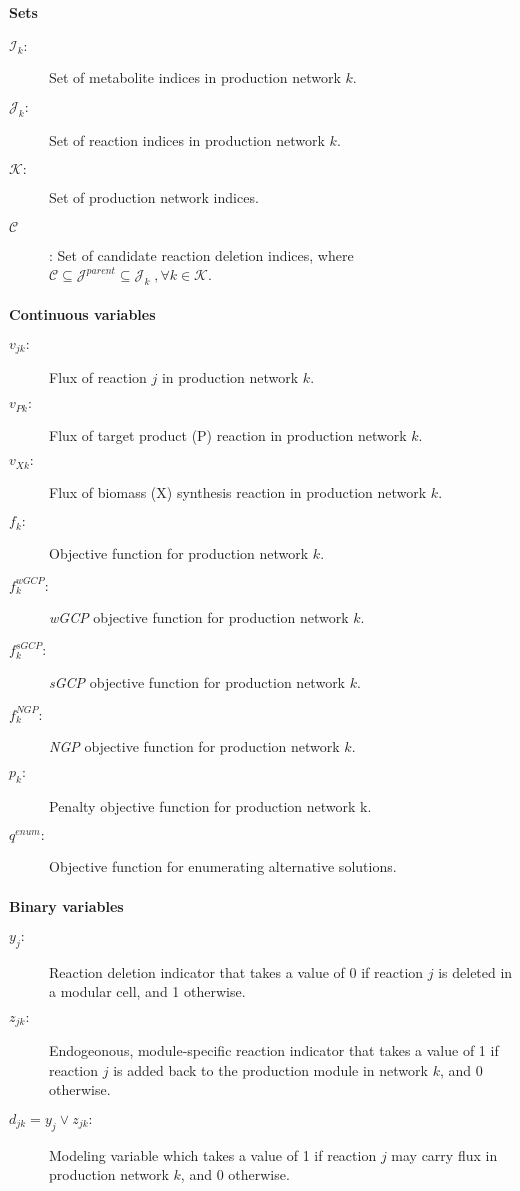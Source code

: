 \paragraph{Sets}
\begin{description}
\item[$\mathcal{I}_k:$] Set of metabolite indices in production network $k$.
\item[$\mathcal{J}_k:$] Set of reaction indices in production network $k$.
\item[$\mathcal{K}:$] Set of production network indices.
\item[$\mathcal{C}$]: Set of candidate reaction deletion indices, where $\mathcal{C} \subseteq \mathcal{J}^{parent} \subseteq \mathcal{J}_k \;, \forall k \in \mathcal{K}$.
\end{description}

\paragraph{Continuous variables}
\begin{description}
\item[$v_{jk}:$] Flux of reaction $j$ in production network $k$.
\item[$v_{Pk}:$] Flux of target product (P) reaction in production network $k$.
\item[$v_{Xk}:$] Flux of biomass (X) synthesis reaction in production network $k$.
\item[$f_k:$] Objective function for production network $k$.
\item[$f_k^{wGCP}:$] \textit{wGCP} objective function for production network $k$.
\item[$f_k^{sGCP}:$] \textit{sGCP} objective function for production network $k$.
\item[$f_k^{NGP}:$] \textit{NGP} objective function for production network $k$.
\item[$p_k:$] Penalty objective function for production network k.
\item[$q^{enum}:$] Objective function for enumerating alternative solutions.
\end{description}

\paragraph{Binary variables}
\begin{description}
\item[$y_j:$] Reaction deletion indicator that takes a value of 0 if reaction $j$ is deleted in a modular cell, and 1 otherwise.
\item[$z_{jk}:$] Endogeonous, module-specific reaction indicator that takes a value of 1 if reaction $j$ is added back to the production module in network $k$, and 0 otherwise.
\item[$d_{jk}= y_j \lor z_{jk}:$] Modeling variable which takes a value of 1 if reaction $j$ may carry flux in production network $k$, and 0 otherwise.
\end{description}

